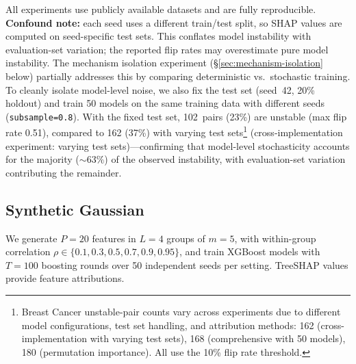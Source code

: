 \documentclass{article}
\begin{document}
\begin{sloppypar}
All experiments use publicly available datasets and are fully reproducible.
\textbf{Confound note:} each seed uses a different train/test split, so SHAP values
are computed on seed-specific test sets. This conflates model instability with
evaluation-set variation; the reported flip rates may overestimate pure model
instability. The mechanism isolation experiment (\S\ref{sec:mechanism-isolation}
below) partially addresses this by comparing deterministic vs.\ stochastic training.
To cleanly isolate model-level noise, we also fix the test set (seed~42, 20\%
holdout) and train 50 models on the same training data with different seeds
(\texttt{subsample=0.8}). With the fixed test set, 102~pairs (23\%) are unstable
(max flip rate 0.51), compared to 162 (37\%) with varying test sets\footnote{Breast Cancer unstable-pair counts vary across experiments due to different model configurations, test set handling, and attribution methods: 162 (cross-implementation with varying test sets), 168 (comprehensive with 50 models), 180 (permutation importance). All use the 10\% flip rate threshold.} (cross-implementation experiment: varying test sets)---confirming that
model-level stochasticity accounts for the majority (${\sim}63\%$) of the observed
instability, with evaluation-set variation contributing the remainder.
\end{sloppypar}

\subsection{Synthetic Gaussian}

\begin{sloppypar}
We generate $P=20$ features in $L=4$ groups of $m=5$, with within-group correlation
$\rho \in \{0.1, 0.3, 0.5, 0.7, 0.9, 0.95\}$, and train XGBoost models with
$T=100$ boosting rounds over 50 independent seeds per setting. TreeSHAP values
provide feature attributions.
\end{sloppypar}
\end{document}
